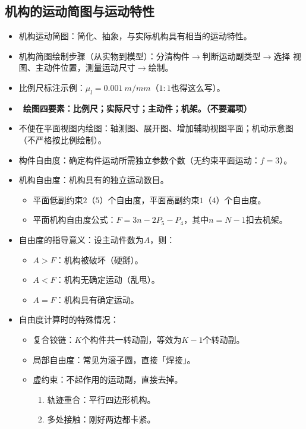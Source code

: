 \documentclass[12pt,a4paper]{article}
\newcommand{\tightlist}{\setlength{\parskip}{0pt}\setlength{\itemsep}{0pt}}
\newcommand{\hint}[1]{\textsf{（#1）}}
\newcommand{\minor}[1]{{\color{gray} #1}}
\newcommand{\then}{$\to$}
\renewcommand{\emph}[1]{\faIcon[regular]{lightbulb}\ \textbf{#1}}
\begin{document}
\subsection{机构的运动简图与运动特性}
\begin{itemize}\tightlist
    \item 机构运动简图：简化、抽象，与实际机构具有相当的运动特性。
    \item 机构简图绘制步骤\hint{从实物到模型}：分清构件\then 判断运动副类型\then 选择
    视图、主动件位置，测量运动尺寸\then 绘制。
    \item 比例尺标注示例：$\mu_l=\SI{0.001}{m/mm}$\hint{$1:1$也得这么写}。
    \item \emph{绘图四要素：比例尺；实际尺寸；主动件；机架。\hint{不要漏项}}
    \item \minor{不便在平面视图内绘图：轴测图、展开图、增加辅助视图平面；机动示意图
    \hint{不严格按比例绘制}。}
    \item 构件自由度：确定构件运动所需独立参数个数\hint{无约束平面运动：$f=3$}。
    \item 机构自由度：机构具有的独立运动数目。
    \begin{itemize}\tightlist
        \item 平面低副约束$2$（$5$）个自由度，平面高副约束$1$（$4$）个自由度。
        \item 平面机构自由度公式：$F=3n-2P_5-P_4$，其中$n=N-1$扣去机架。
    \end{itemize}
    \item 自由度的指导意义：设主动件数为$A$，则：
    \begin{itemize}\tightlist
        \item $A>F$：机构被破坏\hint{硬掰}。
        \item $A<F$：机构无确定运动\hint{乱甩}。
        \item $A=F$：机构具有确定运动。
    \end{itemize}
    \item 自由度计算时的特殊情况：
    \begin{itemize}\tightlist
        \item 复合铰链：$K$个构件共一转动副，等效为$K-1$个转动副。
        \item 局部自由度：常见为滚子圆，直接「焊接」。
        \item 虚约束：不起作用的运动副，直接去掉。
        \begin{enumerate}\tightlist
            \item 轨迹重合：平行四边形机构。
            \item 多处接触：刚好两边都卡紧。

\end{enumerate}
\end{itemize}
\end{itemize}
\end{document}
